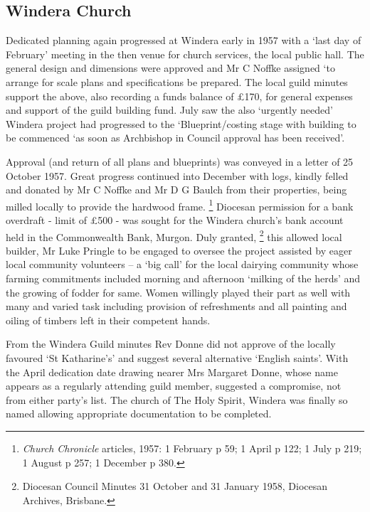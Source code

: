 \hypertarget{windera-church}{%
\subsection{Windera Church}\label{windera-church}}

Dedicated planning again progressed at Windera early in 1957 with a `last day of February' meeting in the then venue for church services, the local public hall. The general design and dimensions were approved and Mr C Noffke assigned `to arrange for scale plans and specifications be prepared. The local guild minutes support the above, also recording a funds balance of £170, for general expenses and support of the guild building fund. July saw the also `urgently needed' Windera project had progressed to the `Blueprint/costing stage with building to be commenced `as soon as Archbishop in Council approval has been received'.

Approval (and return of all plans and blueprints) was conveyed in a letter of 25 October 1957. Great progress continued into December with logs, kindly felled and donated by Mr C Noffke and Mr D G Baulch from their properties, being milled locally to provide the hardwood frame. \footnote{\emph{Church Chronicle} articles, 1957: 1 February p 59; 1 April p 122; 1 July p 219; 1 August p 257; 1 December p 380.} Diocesan permission for a bank overdraft - limit of £500 - was sought for the Windera church's bank account held in the Commonwealth Bank, Murgon. Duly granted, \footnote{Diocesan Council Minutes 31 October and 31 January 1958, Diocesan Archives, Brisbane.} this allowed local builder, Mr Luke Pringle to be engaged to oversee the project assisted by eager local community volunteers -- a `big call' for the local dairying community whose farming commitments included morning and afternoon `milking of the herds' and the growing of fodder for same. Women willingly played their part as well with many and varied task including provision of refreshments and all painting and oiling of timbers left in their competent hands.

From the Windera Guild minutes Rev Donne did not approve of the locally favoured `St Katharine's' and suggest several alternative `English saints'. With the April dedication date drawing nearer Mrs Margaret Donne, whose name appears as a regularly attending guild member, suggested a compromise, not from either party's list. The church of The Holy Spirit, Windera was finally so named allowing appropriate documentation to be completed.

